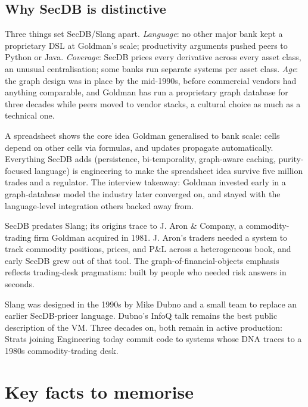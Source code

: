 \subsection{Why SecDB is distinctive}

Three things set SecDB/Slang apart.  \emph{Language}: no other
major bank kept a proprietary DSL at Goldman's scale; productivity
arguments pushed peers to Python or Java.  \emph{Coverage}: SecDB
prices every derivative across every asset class, an unusual
centralisation; some banks run separate systems per asset
class.  \emph{Age}: the graph design was in place by the
mid-1990s, before commercial vendors had anything comparable, and
Goldman has run a proprietary graph database for three decades
while peers moved to vendor stacks, a cultural choice as much
as a technical one.

\begin{intuitionbox}
A spreadsheet shows the core idea Goldman generalised to bank
scale: cells depend on other cells via formulas, and updates
propagate automatically.  Everything SecDB adds (persistence,
bi-temporality, graph-aware caching, purity-focused language)
is engineering to make the spreadsheet idea survive five million
trades and a regulator.  The interview takeaway: Goldman invested
early in a graph-database model the industry later converged on,
and stayed with the language-level integration others backed
away from.
\end{intuitionbox}


\begin{historybox}[title={SecDB, Slang, and the J. Aron heritage}]
SecDB predates Slang; its origins trace to J. Aron \& Company, a
commodity-trading firm Goldman acquired in 1981.  J. Aron's
traders needed a system to track commodity positions, prices, and
P\&L across a heterogeneous book, and early SecDB grew out of
that tool.  The graph-of-financial-objects emphasis reflects
trading-desk pragmatism: built by people who needed risk answers
in seconds.

Slang was designed in the 1990s by Mike Dubno and a small team
to replace an earlier SecDB-pricer language.  Dubno's InfoQ talk
remains the best public description of the VM.  Three decades on,
both remain in active production: Strats joining Engineering
today commit code to systems whose DNA traces to a 1980s
commodity-trading desk.
\end{historybox}


\section{Key facts to memorise}
\label{sec:ch36_key}

